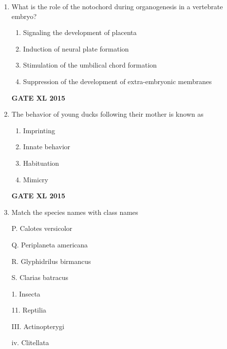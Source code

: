 \documentclass[journal,12pt,onecolumn]{IEEEtran}
\begin{document}
\begin{enumerate}
\item What is the role of the notochord during organogenesis in a vertebrate embryo?
    \begin{enumerate}
            \item Signaling the development of placenta
	    \item  Induction of neural plate formation
	    \item Stimulation of the umbilical chord formation
            \item Suppression of the development of extra-embryonic membranes
    \end{enumerate}
\begin{flushright}\textbf{GATE XL 2015}\end{flushright}
\item  The behavior of young ducks following their mother is known as
    \begin{enumerate}
            \item Imprinting
	    \item Innate behavior
	    \item Habituation
            \item Mimicry
    \end{enumerate}
\begin{flushright}\textbf{GATE XL 2015}\end{flushright}
\item Match the species names with class names

	\begin{minipage}{0.5\textwidth}
		\begin{flushleft}
P. Calotes versicolor

Q. Periplaneta americana

R. Glyphidrilus birmancus

S. Clarias batracus

	\end{flushleft}
	\end{minipage}
	\begin{minipage}{0.5\textwidth}\begin{flushleft}
1. Insecta

11. Reptilia

III. Actinopterygi

iv. Clitellata


\end{flushleft}
\end{minipage}
\end{enumerate}
\end{document}
